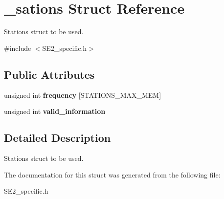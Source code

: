 \hypertarget{struct__sations}{\section{\+\_\+sations Struct Reference}
\label{struct__sations}
}


Stations struct to be used.  




{\ttfamily \#include $<$S\+E2\+\_\+specific.\+h$>$}

\subsection*{Public Attributes}
\begin{DoxyCompactItemize}
\item 
\hypertarget{struct__sations_a63532d8db930b81dcab67b18fa2d1287}{unsigned int {\bfseries frequency} \mbox{[}S\+T\+A\+T\+I\+O\+N\+S\+\_\+\+M\+A\+X\+\_\+\+M\+E\+M\mbox{]}}\label{struct__sations_a63532d8db930b81dcab67b18fa2d1287}

\item 
\hypertarget{struct__sations_a2a0a49265bd245f691587a356f182d82}{unsigned int {\bfseries valid\+\_\+information}}\label{struct__sations_a2a0a49265bd245f691587a356f182d82}

\end{DoxyCompactItemize}


\subsection{Detailed Description}
Stations struct to be used. 

The documentation for this struct was generated from the following file\+:\begin{DoxyCompactItemize}
\item 
S\+E2\+\_\+specific.\+h\end{DoxyCompactItemize}
